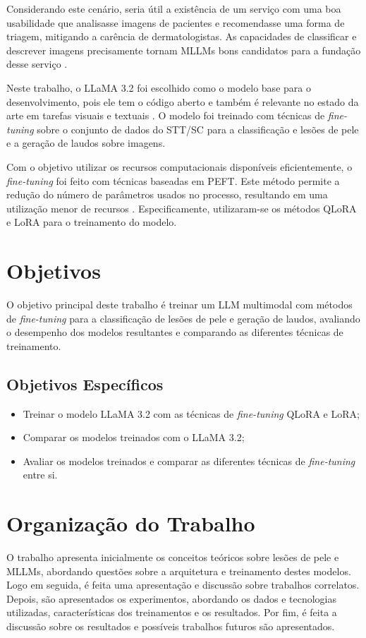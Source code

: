 Considerando este cenário, seria útil a existência de um serviço com uma boa usabilidade que analisasse imagens de pacientes e recomendasse uma forma de triagem,
mitigando a carência de dermatologistas. As capacidades de classificar e descrever imagens precisamente tornam \acp{MLLM} bons candidatos para a fundação desse serviço
\cite{mllm_success_rate}.

Neste trabalho, o \ac{LLaMA} 3.2 foi escolhido como o modelo base para o desenvolvimento, pois ele tem o código aberto e também é relevante no estado da arte em tarefas
visuais e textuais \cite{dubey2024llama}. O modelo foi treinado com técnicas de \textit{fine-tuning} sobre o conjunto de dados do \ac{STT/SC} para a classificação e lesões
de pele e a geração de laudos sobre imagens.

Com o objetivo utilizar os recursos computacionais disponíveis eficientemente, o \textit{fine-tuning} foi feito com técnicas baseadas em \ac{PEFT}. Este método permite a
redução do número de parâmetros usados no processo, resultando em uma utilização menor de recursos \cite{peft}. Especificamente, utilizaram-se os métodos \ac{QLoRA} e
\ac{LoRA} para o treinamento do modelo.

\section{Objetivos}

O objetivo principal deste trabalho é treinar um \ac{LLM} multimodal com métodos de \textit{fine-tuning} para a classificação de lesões de pele e geração de laudos,
avaliando o desempenho dos modelos resultantes e comparando as diferentes técnicas de treinamento.

\subsection*{Objetivos Específicos}

\begin{itemize}
    \item Treinar o modelo \ac{LLaMA} 3.2 com as técnicas de \textit{fine-tuning} \ac{QLoRA} e \ac{LoRA};
    \item Comparar os modelos treinados com o \ac{LLaMA} 3.2;
    \item Avaliar os modelos treinados e comparar as diferentes técnicas de \textit{fine-tuning} entre si.
\end{itemize}

\section{Organização do Trabalho}


O trabalho apresenta inicialmente os conceitos teóricos sobre lesões de pele e \acp{MLLM}, abordando questões sobre a arquitetura e treinamento destes modelos. Logo
em seguida, é feita uma apresentação e discussão sobre trabalhos correlatos. Depois, são apresentados os experimentos, abordando os dados e tecnologias utilizadas,
características dos treinamentos e os resultados. Por fim, é feita a discussão sobre os resultados e possíveis trabalhos futuros são apresentados.
